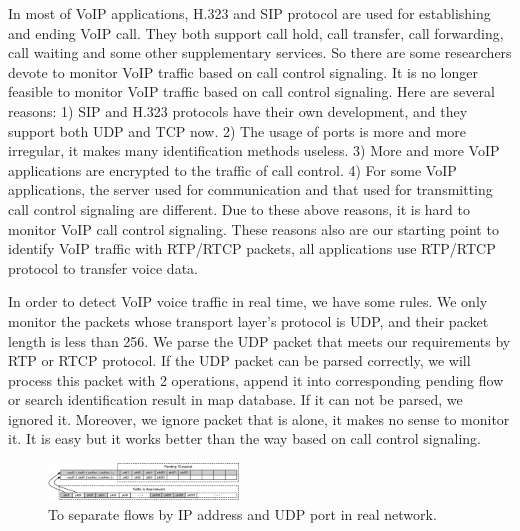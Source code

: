 \documentclass[conference]{IEEEtran}
\begin{document}
In most of VoIP applications, H.323 and SIP protocol are used for establishing and ending VoIP call. They both support call hold, call transfer, call forwarding, call waiting and some other supplementary services. So there are some researchers devote to monitor VoIP traffic based on call control signaling. It is no longer feasible to monitor VoIP traffic based on call control signaling. Here are several reasons: 1) SIP and H.323 protocols have their own development, and they support both UDP and TCP now. 2) The usage of ports is more and more irregular, it makes many identification methods useless. 3) More and more VoIP applications are encrypted to the traffic of call control. 4) For some VoIP applications, the server used for communication and that used for transmitting call control signaling are different. Due to these above reasons, it is hard to monitor VoIP call control signaling. These reasons also are our starting point to identify VoIP traffic with RTP/RTCP packets, all applications use RTP/RTCP protocol to transfer voice data.

In order to detect VoIP voice traffic in real time, we have some rules. We only monitor the packets whose transport layer's protocol is UDP, and their packet length is less than 256. We parse the UDP packet that meets our requirements by RTP or RTCP protocol. If the UDP packet can be parsed correctly, we will process this packet with 2 operations, append it into corresponding pending flow or search identification result in map database. If it can not be parsed, we ignored it. Moreover, we ignore packet that is alone, it makes no sense to monitor it. It is easy but it works better than the way based on call control signaling.

\begin{figure}[htp]
\begin{center}
\includegraphics[width=0.45\textwidth]{flow.eps}
\caption{To separate flows by IP address and UDP port in real network.}\label{fig:flow}
\end{center}
\end{figure}
\end{document}
